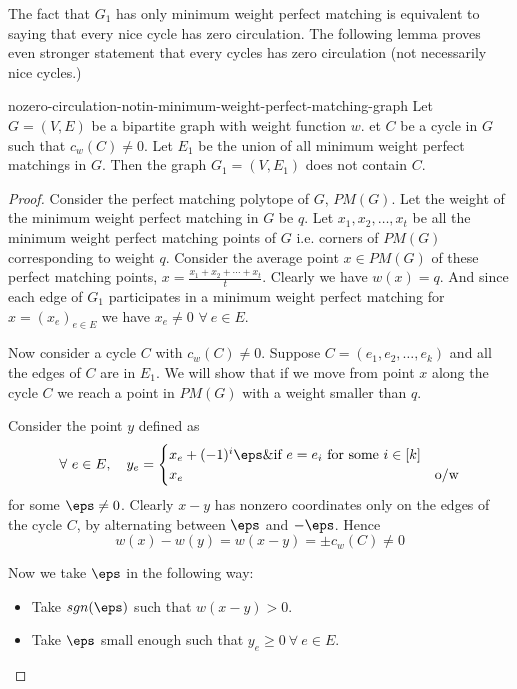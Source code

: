 The fact that $G_1$ has only minimum weight perfect matching is equivalent to saying that every nice cycle has zero circulation. The following lemma proves even stronger statement that every cycles has zero circulation (not necessarily nice cycles.)
\begin{Lemma}{\cite[Lemma 3.2]{FennerGurjarThierauf_2016_Bpm_CONF}}{nozero-circulation-notin-minimum-weight-perfect-matching-graph}
	Let $G=(V,E)$ be a bipartite graph with weight function $w$. et $C$ be a cycle in $G$ such that $c_w(C)\neq 0$. Let $E_1$ be the union of all minimum weight perfect matchings in $G$. Then the graph $G_1=(V,E_1)$ does not contain $C$.
\end{Lemma}
\begin{proof}
	Consider the perfect matching polytope of $G$, $PM(G)$. Let the weight of the minimum weight perfect matching in $G$ be $q$. Let $x_1,x_2,\dots,x_t$ be all the minimum weight perfect matching points of $G$ i.e. corners of $PM(G)$ corresponding to weight $q$. Consider the average point $x\in PM(G)$ of these perfect matching points, $x=\frac{x_1+x_2+\cdots+x_t}{t}$. Clearly we have $w(x)=q$. And since each edge of $G_1$ participates in a minimum weight perfect matching for $x=(x_e)_{e\in E}$ we have $x_e\neq 0$ $\forall\ e\in E$.

	Now consider a cycle $C$ with $c_w(C)\neq 0$. Suppose $C=(e_1,e_2,\dots, e_{k})$ and all the edges of $C$ are in $E_1$. We will show that if we move from point $x$ along the cycle $C$ we reach a point in $PM(G)$ with a weight smaller than $q$.

	Consider the point $y$ defined as $$\forall\ e\in E,\quad y_e=\begin{cases}
			x_e+(-1)^i\eps\& \text{if $e=e_i$ for some $i\in[k]$} \\
			x_e & \text{o/w}
		\end{cases}$$for some $\eps\neq 0$. Clearly $x-y$ has nonzero coordinates only on the edges of the cycle $C$, by alternating between $\eps$ and $-\eps$. Hence $$w(x)-w(y)=w(x-y)=\pm c_w(C)\neq 0$$

	Now we take $\eps$ in the following way:
	\begin{itemize}
		\item Take $sgn(\eps)$ such that $w(x-y)>0$.
		\item Take $\eps$ small enough such that $y_e\geq 0\ \forall\ e\in E$.
	\end{itemize}


\end{proof}
